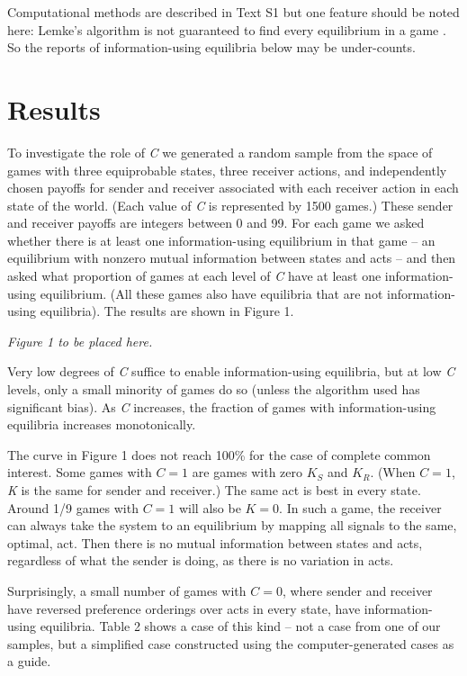 \documentclass[10pt]{article}
\begin{document}
Computational methods are described in Text S1 but
one feature should be noted here: Lemke's algorithm is not guaranteed to
find every equilibrium in a game \cite{Koller1996}. So the reports of
information-using equilibria below may be under-counts.

\section*{Results}

To investigate the role of \emph{C} we generated a random sample from
the space of games with three equiprobable states, three receiver
actions, and independently chosen payoffs for sender and receiver
associated with each receiver action in each state of the world. (Each
value of \emph{C} is represented by 1500 games.) These sender and
receiver payoffs are integers between 0 and 99. For each game we asked
whether there is at least one information-using equilibrium in that game
-- an equilibrium with nonzero mutual information between states and
acts -- and then asked what proportion of games at each level of
\emph{C} have at least one information-using equilibrium. (All these
games also have equilibria that are not information-using equilibria).
The results are shown in Figure 1.

\emph{Figure 1 to be placed here.}

Very low degrees of \emph{C} suffice to enable information-using
equilibria, but at low \emph{C} levels, only a small minority of games
do so (unless the algorithm used has significant bias). As \emph{C}
increases, the fraction of games with information-using equilibria
increases monotonically.

The curve in Figure 1 does not reach 100\% for the case of complete
common interest. Some games with $C=1$ are games with zero
$K_{S}$ and $K_{R}$. (When $C=1$, \emph{K} is the
same for sender and receiver.) The same act is best in every state. Around 1/9 games with $C=1$ will also be $K=0$. In such a game, the
receiver can always take the system to an equilibrium by mapping all
signals to the same, optimal, act. Then there is no mutual information
between states and acts, regardless of what the sender is doing, as
there is no variation in acts.

Surprisingly, a small number of games with $C=0$, where sender and
receiver have reversed preference orderings over acts in every state,
have information-using equilibria. Table 2 shows a case of this kind --
not a case from one of our samples, but a simplified case constructed
using the computer-generated cases as a guide.
\end{document}
